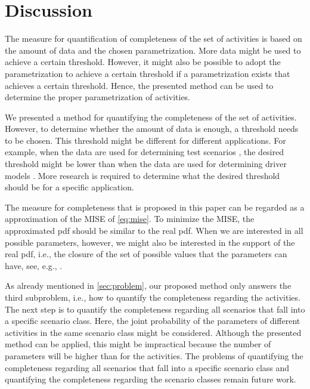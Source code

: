 \section{Discussion}
\label{sec:discussion}

The measure for quantification of completeness of the set of activities is based on the amount of data and the chosen parametrization. More data might be used to achieve a certain threshold. However, it might also be possible to adopt the parametrization to achieve a certain threshold if a parametrization exists that achieves a certain threshold. Hence, the presented method can be used to determine the proper parametrization of activities.

We presented a method for quantifying the completeness of the set of activities. However, to determine whether the amount of data is enough, a threshold needs to be chosen. This threshold might be different for different applications. For example, when the data are used for determining test scenarios \cite{elrofai2018scenario, ploeg2018cetran}, the desired threshold might be lower than when the data are used for determining driver models \cite{wang2017much, sadigh2014data}. More research is required to determine what the desired threshold should be for a specific application.

The measure for completeness that is proposed in this paper can be regarded as a approximation of the MISE of \cref{eq:mise}. To minimize the MISE, the approximated pdf should be similar to the real pdf. When we are interested in all possible parameters, however, we might also be interested in the support of the real pdf, i.e., the closure of the set of possible values that the parameters can have, see, e.g., \textcite{scholkopf2001estimating}.

As already mentioned in \cref{sec:problem}, our proposed method only answers the third subproblem, i.e., how to quantify the completeness regarding the activities. The next step is to quantify the completeness regarding all scenarios that fall into a specific scenario class. Here, the joint probability of the parameters of different activities in the same scenario class might be considered. Although the presented method can be applied, this might be impractical because the number of parameters will be higher than for the activities. The problems of quantifying the completeness regarding all scenarios that fall into a specific scenario class and quantifying the completeness regarding the scenario classes remain future work.

